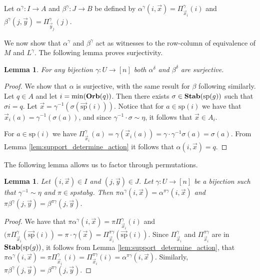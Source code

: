 \documentclass[12pt]{report}
\newtheorem{lem}[thm]{Lemma} \newtheorem{prop}[thm]{Proposition}
\newcommand{\stab}{\text{\textbf{Stab}}}
\newcommand{\orb}{\text{\textbf{Orb}}}
\newcommand{\consp}{\text{sp}}
\newcommand{\spstab}[1]{\stab (\consp (#1))}
\begin{document}
Let $\alpha^{\gamma}: I \rightarrow A$ and $\beta^{\gamma}: J \rightarrow B$ be
defined by $\alpha^{\gamma} (i, \vec{x}) = \Pi^{\gamma}_{\vec{x}_{i}}(i)$ and
$\beta^{\gamma} (j, \vec{y}) = \Pi^{\gamma}_{\vec{y}_{j}}(j)$.

We now show that $\alpha^{\gamma}$ and $\beta^{\gamma}$ act as witnesses to the
row-column of equivalence of $M$ and $L^{\gamma}$. The following lemma proves
surjectivity.

\begin{lem} 
  For any bijection $\gamma : U \rightarrow [n]$ both $\alpha^{\delta}$ and
  $\beta^{\delta}$ are surjective.
\end{lem}
\begin{proof}
  We show that $\alpha$ is surjective, with the same result for $\beta$
  following similarly. Let $q \in A$ and let $i = \min (\orb (q))$. Then there
  exists $\sigma \in \spstab{g}$ such that $\sigma i = q$. Let $\vec{x} =
  \gamma^{-1} (\sigma(\vec{\consp}(i)))$. Notice that for $a \in \consp(i)$ we
  have that $\vec{x}_i(a) = \gamma^{-1} (\sigma (a))$, and since $\gamma^{-1}
  \cdot \sigma \sim \eta$, it follows that $\vec{x} \in A_i$.

  For $a \in \consp(i)$ we have $\Pi^{\gamma}_{\vec{x}_i} (a) = \gamma
  (\vec{x}_i(a)) = \gamma \cdot \gamma^{-1} \sigma (a) = \sigma (a)$. From Lemma
  \ref{lem:support_determine_action} it follows that $\alpha(i, \vec{x}) = q$.
\end{proof}

The following lemma allows us to factor through permutations.
\begin{lem}
  \label{lem:alpha_and_gamma}
  Let $(i,\vec{x}) \in I$ and $(j, \vec{y}) \in J$. Let $\gamma: U \rightarrow
  [n]$ be a bijection such that $\gamma^{-1} \sim \eta$ and $\pi \in spstab{g}$.
  Then $\pi \alpha^{\gamma}(i, \vec{x}) = \alpha^{\pi \gamma}(i, \vec{x})$ and
  $\pi \beta^{\gamma}(j, \vec{y}) = \beta^{\pi \gamma}(j, \vec{y})$.
\end{lem}
\begin{proof}
  We have that $\pi \alpha^{\gamma}(i, \vec{x}) = \pi
  \Pi^{\gamma}_{\vec{x}_i}(i)$ and $(\pi
  \Pi^{\gamma}_{\vec{x}_{i}}(\vec{\consp}(i)) = \pi \cdot \gamma (\vec{x}) =
  \Pi^{\pi \gamma}_{\vec{x}_i}(\vec{\consp}(i))$. Since
  $\Pi^{\gamma}_{\vec{x}_i}$ and $\Pi^{\pi \gamma}_{\vec{x}_i}$ are in
  $\spstab{g}$, it follows from Lemma \ref{lem:support_determine_action}, that
  $\pi \alpha^{\gamma}(i, \vec{x}) = \pi \Pi^{\gamma}_{\vec{x}_i} (i) = \Pi^{\pi
    \gamma}_{\vec{x}_i}(i) = \alpha^{\pi \gamma}(i, \vec{x})$. Similarly, $\pi
  \beta^{\gamma}(j, \vec{y}) = \beta^{\pi \gamma} (j, \vec{y})$.
\end{proof}
\end{document}
